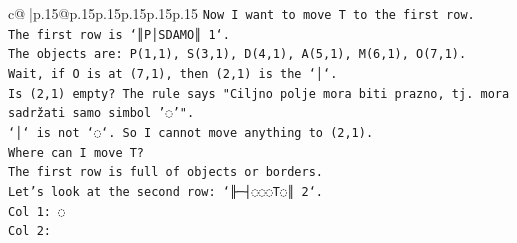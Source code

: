 \documentclass{article}
\begin{document}
{\begin{supertabular}{c@{$\;$}|p{.15\linewidth}@{}p{.15\linewidth}p{.15\linewidth}p{.15\linewidth}p{.15\linewidth}p{.15\linewidth}}
{{{\texttt{Now I want to move T to the first row.} \\
\texttt{The first row is `║P│SDAMO║ 1`.} \\
\texttt{The objects are: P(1,1), S(3,1), D(4,1), A(5,1), M(6,1), O(7,1).} \\
\texttt{Wait, if O is at (7,1), then (2,1) is the `│`.} \\
\texttt{Is (2,1) empty? The rule says "Ciljno polje mora biti prazno, tj. mora sadržati samo simbol '◌'".} \\
\texttt{`│` is not `◌`. So I cannot move anything to (2,1).} \\
\texttt{Where can I move T?} \\
\texttt{The first row is full of objects or borders.} \\
\texttt{Let's look at the second row: `╟─┤◌◌◌T◌║ 2`.} \\
\texttt{Col 1: ◌} \\
\texttt{Col 2:} \\
            }
        }
    }
     \\ \\


\end{supertabular}}
\end{document}
